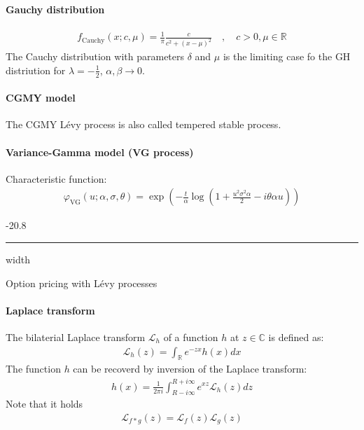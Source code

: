 \documentclass[a4paper,landscape,7pt,fleqn]{scrartcl}
\makeatletter
\renewcommand{\subsubsection}{\@startsection{subsubsection}{1}{0mm}%
{-2\baselineskip}{0.8\baselineskip}%
{\hrule depth 0.2pt width\columnwidth\vspace*{1.2em}\normalsize\bfseries}}
\makeatother
\begin{document}
\begin{multicols*}{3}
\paragraph{Gauchy distribution}
\begin{align*}
f_\text{Cauchy} (x; c, \mu) = \frac{1}{\pi} \frac{c}{c^2 + (x-\mu)^2} \quad , \quad c>0, \mu \in \mathbb{R}
\end{align*}
The Cauchy distribution with parameters $\delta$ and $\mu$ is the limiting case fo the GH distriution for $\lambda = -\frac{1}{2}$, $\alpha, \beta \rightarrow 0$.

\paragraph{CGMY model}
The CGMY Lévy process is also called tempered stable process.

\paragraph{Variance-Gamma model (VG process)}
Characteristic function:
\begin{align*}
\varphi_\text{VG} (u; \alpha, \sigma, \theta) = \exp \left( - \frac{t}{\alpha} \log \left( 1 + \frac{u^2 \sigma^2 \alpha}{2} - i \theta \alpha u \right) \right)
\end{align*}

\subsubsection{Option pricing with Lévy processes}

\paragraph{Laplace transform}
The bilaterial Laplace transform $\mathcal{L}_h$ of a function $h$ at $z \in \mathbb{C}$ is defined as:
\begin{align*}
\mathcal{L}_h(z) = \int_\mathbb{R} e^{-z x} h(x) dx
\end{align*}
The function $h$ can be recoverd by inversion of the Laplace transform:
\begin{align*}
h(x) = \frac{1}{2 \pi i} \int_{R-i \infty}^{R+i \infty} e^{x z} \mathcal{L}_h(z) dz
\end{align*}
Note that it holds
\begin{align*}
\mathcal{L}_{f \ast g}(z) = \mathcal{L}_f(z) \mathcal{L}_g(z)
\end{align*}


\end{multicols*}
\end{document}
